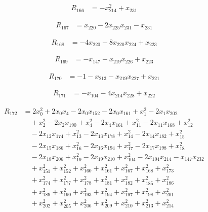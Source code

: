 \begin{align*}
R_{166} &= -x_{214}^{2} +x_{231}
\end{align*}

\begin{align*}
R_{167} &= x_{220} -2 x_{225} x_{231} -x_{231}
\end{align*}

\begin{align*}
R_{168} &= -4 x_{220} -8 x_{220} x_{224} +x_{223}
\end{align*}

\begin{align*}
R_{169} &= -x_{147} -x_{219} x_{226} +x_{223}
\end{align*}

\begin{align*}
R_{170} &= -1 -x_{213} -x_{219} x_{227} +x_{221}
\end{align*}

\begin{align*}
R_{171} &= -x_{104} -4 x_{214} x_{228} +x_{222}
\end{align*}

\begin{align*}
R_{172} &= 2 x_{0}^{2} +2 x_{0} x_{4} -2 x_{0} x_{152} -2 x_{0} x_{161} +x_{1}^{2} -2 x_{1} x_{202} \\
&\quad +x_{2}^{2} -2 x_{2} x_{190} +x_{4}^{2} -2 x_{4} x_{161} +x_{11}^{2} -2 x_{11} x_{168} +x_{12}^{2} \\
&\quad -2 x_{12} x_{174} +x_{13}^{2} -2 x_{13} x_{178} +x_{14}^{2} -2 x_{14} x_{182} +x_{15}^{2} \\
&\quad -2 x_{15} x_{186} +x_{16}^{2} -2 x_{16} x_{194} +x_{17}^{2} -2 x_{17} x_{198} +x_{18}^{2} \\
&\quad -2 x_{18} x_{206} +x_{19}^{2} -2 x_{19} x_{210} +x_{104}^{2} -2 x_{104} x_{214} -x_{147} x_{232} \\
&\quad +x_{151}^{2} +x_{152}^{2} +x_{160}^{2} +x_{161}^{2} +x_{167}^{2} +x_{168}^{2} +x_{173}^{2} \\
&\quad +x_{174}^{2} +x_{177}^{2} +x_{178}^{2} +x_{181}^{2} +x_{182}^{2} +x_{185}^{2} +x_{186}^{2} \\
&\quad +x_{189}^{2} +x_{190}^{2} +x_{193}^{2} +x_{194}^{2} +x_{197}^{2} +x_{198}^{2} +x_{201}^{2} \\
&\quad +x_{202}^{2} +x_{205}^{2} +x_{206}^{2} +x_{209}^{2} +x_{210}^{2} +x_{213}^{2} +x_{214}^{2}
\end{align*}

